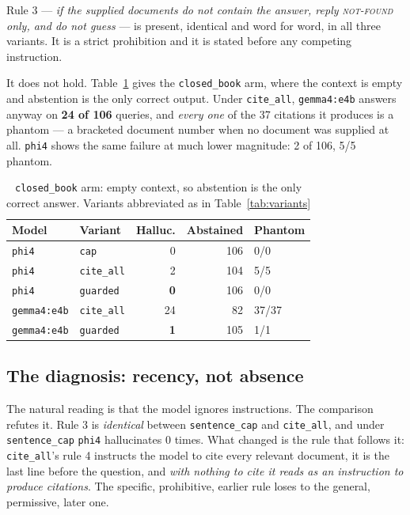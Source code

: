 \documentclass[conference]{IEEEtran}
\begin{document}
Rule 3 --- \emph{if the supplied documents do not contain the answer, reply
\textsc{not-found} only, and do not guess} --- is present, identical and word for
word, in all three variants. It is a strict prohibition and it is stated before
any competing instruction.

It does not hold. Table~\ref{tab:closed} gives the \texttt{closed\_book} arm,
where the context is empty and abstention is the only correct output. Under
\texttt{cite\_all}, \texttt{gemma4:e4b} answers anyway on \textbf{24 of 106}
queries, and \emph{every one} of the 37 citations it produces is a phantom --- a
bracketed document number when no document was supplied at all. \texttt{phi4}
shows the same failure at much lower magnitude: 2 of 106, 5/5 phantom.

\begin{table}[t]
\caption{\texttt{closed\_book} arm: empty context, so abstention is the only
correct answer. Variants abbreviated as in Table~\ref{tab:variants}}
\label{tab:closed}
\centering
\small
\begin{tabular}{llrrl}
\toprule
Model & Variant & Halluc. & Abstained & Phantom \\
\midrule
\texttt{phi4} & \texttt{cap}     & 0  & 106 & 0/0 \\
\texttt{phi4} & \texttt{cite\_all} & 2  & 104 & 5/5 \\
\texttt{phi4} & \texttt{guarded} & \textbf{0} & 106 & 0/0 \\
\midrule
\texttt{gemma4:e4b} & \texttt{cite\_all} & 24 & 82  & 37/37 \\
\texttt{gemma4:e4b} & \texttt{guarded} & \textbf{1} & 105 & 1/1 \\
\bottomrule
\end{tabular}
\end{table}

\subsection{The diagnosis: recency, not absence}

The natural reading is that the model ignores instructions. The comparison
refutes it. Rule 3 is \emph{identical} between \texttt{sentence\_cap} and
\texttt{cite\_all}, and under \texttt{sentence\_cap} \texttt{phi4} hallucinates
0 times. What changed is the rule that follows it: \texttt{cite\_all}'s rule 4
instructs the model to cite every relevant document, it is the last line before
the question, and \emph{with nothing to cite it reads as an instruction to
produce citations}. The specific, prohibitive, earlier rule loses to the general,
permissive, later one.
\end{document}
